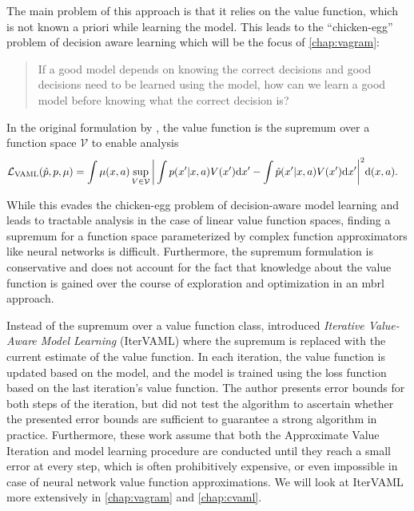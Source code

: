 The main problem of this approach is that it relies on the value function, which is not known a priori while learning the model. 
This leads to the ``chicken-egg'' problem of decision aware learning which will be the focus of \autoref{chap:vagram}:

\begin{quote}
    {If a good model depends on knowing the correct decisions and good decisions need to be learned using the model, how can we learn a good model before knowing what the correct decision is?}
\end{quote}

In the original formulation by \textcite{vaml}, the value function is the supremum over a function space $\mathcal{V}$ to enable analysis
\begin{align}
    &\mathcal{L}_\text{VAML}(\hat{p}, p, \mu) = \int \mu(x,a) \sup_{V\in \mathcal{V}}\bigg|\int p(x'|x,a)V(x')\mathrm{d}x'  - \int \hat{p}(x'|x,a) V(x') \mathrm{d}x'\bigg|^2 \mathrm{d} (x,a).
\end{align}

While this evades the chicken-egg problem of decision-aware model learning and leads to tractable analysis in the case of linear value function spaces, finding a supremum for a function space parameterized by complex function approximators like neural networks is difficult.
Furthermore, the supremum formulation is conservative and does not account for the fact that knowledge about the value function is gained over the course of exploration and optimization in an \ac{mbrl} approach.

Instead of the supremum over a value function class, \textcite{itervaml} introduced \emph{Iterative Value-Aware Model Learning} (IterVAML) where the supremum is replaced with the current estimate of the value function.
In each iteration, the value function is updated based on the model, and the model is trained using the loss function based on the last iteration's value function.
The author presents error bounds for both steps of the iteration, but did not test the algorithm to ascertain whether the presented error bounds are sufficient to guarantee a strong algorithm in practice. 
Furthermore, these work assume that both the Approximate Value Iteration and model learning procedure are conducted until they reach a small error at every step, which is often prohibitively expensive, or even impossible in case of neural network value function approximations.
We will look at IterVAML more extensively in \autoref{chap:vagram} and \autoref{chap:cvaml}.



